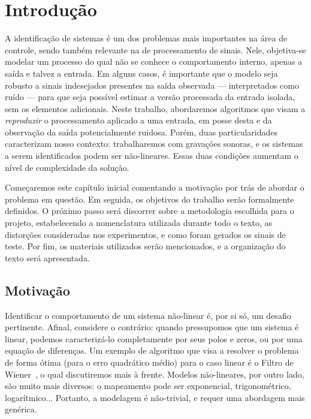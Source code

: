 \chapter{Introdução}
\label{chapter:intro}

A identificação de sistemas é um dos problemas mais importantes na área de controle, sendo também relevante na de processamento de sinais. Nele, objetiva-se modelar um processo do qual não se conhece o comportamento interno, apenas a saída e talvez a entrada. Em alguns casos, é importante que o modelo seja robusto a sinais indesejados presentes na saída observada --- interpretados como ruído --- para que seja possível estimar a versão processada da entrada isolada, sem os elementos adicionais. Neste trabalho, abordaremos algoritmos que visam a \emph{reproduzir} o processamento aplicado a uma entrada, em posse desta e da observação da saída potencialmente ruidosa. Porém, duas particularidades caracterizam nosso contexto: trabalharemos com gravações sonoras, e os sistemas a serem identificados podem ser não-lineares. Essas duas condições aumentam o nível de complexidade da solução.

Começaremos este capítulo inicial comentando a motivação por trás de abordar o problema em questão. Em seguida, os objetivos do trabalho serão formalmente definidos. O próximo passo será discorrer sobre a metodologia escolhida para o projeto, estabelecendo a nomenclatura utilizada durante todo o texto, as distorções consideradas nos experimentos, e como foram gerados os sinais de teste. Por fim, os materiais utilizados serão mencionados, e a organização do texto será apresentada.

\section{Motivação}

Identificar o comportamento de um sistema não-linear é, por si só, um desafio pertinente. Afinal, considere o contrário: quando pressupomos que um sistema é linear, podemos caracterizá-lo completamente por seus polos e zeros, ou por uma equação de diferenças. Um exemplo de algoritmo que visa a resolver o problema de forma ótima (para o erro quadrático médio) para o caso linear é o Filtro de Wiener~\cite{hayes-1996}, o qual discutiremos mais à frente. Modelos não-lineares, por outro lado, são muito mais diversos: o mapeamento pode ser exponencial, trigonométrico, logarítmico... Portanto, a modelagem é não-trivial, e requer uma abordagem mais genérica.


